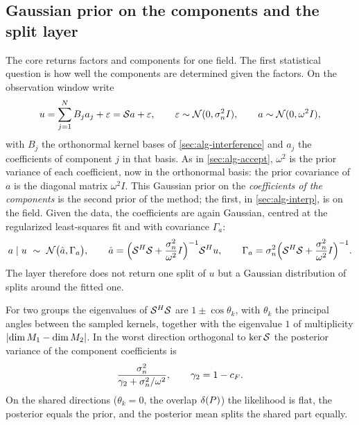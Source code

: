 \subsection{Gaussian prior on the components and the split layer}\label{sec:bayes-split}
The core returns factors and components for one field. The first statistical question is how well the
components are determined given the factors. On the observation window write
\begin{equation}\label{eq:linmodel}
  u=\sum_{j=1}^NB_ja_j+\varepsilon=\mathcal{S} a+\varepsilon,\qquad \varepsilon\sim\mathcal{N}(0,\sigma_{n}^2I),\qquad a\sim\mathcal{N}(0,\omega^2I),
\end{equation}
with $B_j$ the orthonormal kernel bases of \cref{sec:alg-interference} and $a_j$ the coefficients of component $j$ in
that basis. As in \cref{sec:alg-accept}, $\omega^2$ is the prior variance of each coefficient, now in the orthonormal
basis: the prior covariance of $a$ is the diagonal matrix $\omega^2I$. This Gaussian prior on the \emph{coefficients of the components} is the second
prior of the method; the first, in \cref{sec:alg-interp}, is on the field. Given the data, the coefficients are again
Gaussian, centred at the regularized least-squares fit and with covariance $\Gamma_a$:
\begin{equation}\label{eq:postcov}
  a\mid u\ \sim\ \mathcal{N}\big(\hat a,\Gamma_a\big),\qquad
  \hat a=\Big(\mathcal{S}^H\mathcal{S}+\frac{\sigma_{n}^2}{\omega^2}I\Big)^{-1}\mathcal{S}^Hu,\qquad
  \Gamma_a=\sigma_{n}^2\Big(\mathcal{S}^H\mathcal{S}+\frac{\sigma_{n}^2}{\omega^2}I\Big)^{-1}.
\end{equation}
The layer therefore does not return one split of $u$ but a Gaussian distribution of splits around the fitted one.

\begin{proposition}\label{prop:bayes-angle}
For two groups the eigenvalues of $\mathcal{S}^H\mathcal{S}$ are $1\pm\cos\theta_k$, with $\theta_k$ the principal
angles between the sampled kernels, together with the eigenvalue $1$ of multiplicity
$\lvert\dim M_1-\dim M_2\rvert$. In the worst direction orthogonal to $\ker\mathcal{S}$ the posterior variance of the component
coefficients is
\begin{equation}\label{eq:worstvar}
  \frac{\sigma_{n}^2}{\gamma_2+\sigma_{n}^2/\omega^2},\qquad \gamma_2=1-c_{F} .
\end{equation}
On the shared directions ($\theta_k=0$, the overlap $\delta(P)$) the likelihood is flat, the posterior equals
the prior, and the posterior mean splits the shared part equally.
\end{proposition}

